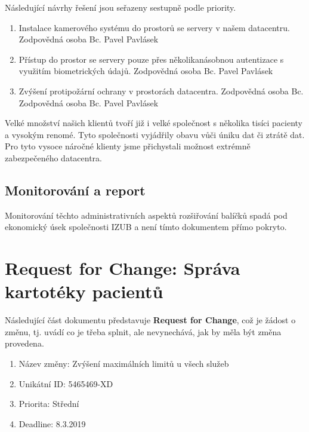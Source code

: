 \documentclass[11pt, a4paper, titlepage]{article}
\begin{document}
	Následující návrhy řešení jsou seřazeny sestupně podle priority.

	\begin{enumerate}
		\item Instalace kamerového systému do prostorů se servery v našem datacentru. Zodpovědná osoba Bc. Pavel Pavlásek
		\item Přístup do prostor se servery pouze přes několikanásobnou autentizace s využitím biometrických údajů. Zodpovědná osoba Bc. Pavel Pavlásek
		\item Zvýšení protipožární ochrany v prostorách datacentra. Zodpovědná osoba Bc. Zodpovědná osoba Bc. Pavel Pavlásek
	\end{enumerate}

	Velké množství našich klientů tvoří již i velké společnost s několika tisíci pacienty a vysokým renomé. Tyto společnosti vyjádřily obavu vůči úniku dat či ztrátě dat. Pro tyto vysoce náročné klienty jsme přichystali možnost extrémně zabezpečeného datacentra.

	\subsection{Monitorování a report}

	Monitorování těchto administrativních aspektů rozšiřování balíčků spadá pod ekonomický úsek společnosti IZUB a není tímto dokumentem přímo pokryto.

	\section*{Request for Change: Správa kartotéky pacientů}

	\vspace{0.5em}

	\noindent Následující část dokumentu představuje \textbf{Request for Change}, což je žádost o změnu, tj. uvádí co je třeba splnit, ale nevynechává, jak by měla být změna provedena.

	\noindent\makebox[\linewidth]{\rule{17.5cm}{0.4pt}}

	\begin{enumerate}
		\item Název změny: Zvýšení maximálních limitů u všech služeb
		\item Unikátní ID: 5465469-XD
		\item Priorita:	Střední
		\item Deadline: 8.3.2019
	\end{enumerate}
\end{document}
